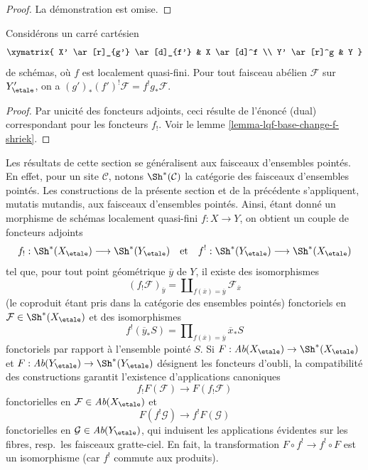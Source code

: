 \begin{proof}
La démonstration est omise.
\end{proof}

\begin{lemma}
\label{lemma-lqf-base-change-upper-shriek}
Considérons un carré cartésien
$$
\xymatrix{
X' \ar[r]_{g'} \ar[d]_{f'} & X \ar[d]^f \\
Y' \ar[r]^g & Y
}
$$
de schémas, où $f$ est localement quasi-fini. Pour tout faisceau abélien $\mathcal{F}$
sur $Y'_\etale$, on a $(g')_*(f')^!\mathcal{F} = f^!g_*\mathcal{F}$.
\end{lemma}

\begin{proof}
Par unicité des foncteurs adjoints, ceci résulte de
l'énoncé (dual) correspondant pour les foncteurs $f_!$.
Voir le lemme \ref{lemma-lqf-base-change-f-shriek}.
\end{proof}

\begin{remark}
\label{remark-pointed-sets}
Les résultats de cette section se généralisent aux faisceaux d'ensembles pointés.
En effet, pour un site $\mathcal{C}$, notons $\Sh^*(\mathcal{C})$ la catégorie des
faisceaux d'ensembles pointés. Les constructions de la présente section et de la précédente
s'appliquent, mutatis mutandis, aux faisceaux d'ensembles pointés. Ainsi, étant donné un morphisme
de schémas localement quasi-fini $f : X \to Y$, on obtient
un couple de foncteurs adjoints
$$
f_! : \Sh^*(X_\etale) \longrightarrow \Sh^*(Y_\etale)
\quad\text{et}\quad
f^! : \Sh^*(Y_\etale) \longrightarrow \Sh^*(X_\etale)
$$
tel que, pour tout point géométrique $\overline{y}$ de $Y$, il existe des
isomorphismes
$$
(f_!\mathcal{F})_{\overline{y}} =
\coprod\nolimits_{f(\overline{x}) = \overline{y}}
\mathcal{F}_{\overline{x}}
$$
(le coproduit étant pris dans la catégorie des ensembles pointés) fonctoriels en
$\mathcal{F} \in \Sh^*(X_\etale)$ et des isomorphismes
$$
f^!(\overline{y}_*S) =
\prod\nolimits_{f(\overline{x}) = \overline{y}}
\overline{x}_*S
$$
fonctoriels par rapport à l'ensemble pointé $S$. Si
$F : \textit{Ab}(X_\etale) \to \Sh^*(X_\etale)$ et
$F : \textit{Ab}(Y_\etale) \to \Sh^*(Y_\etale)$
désignent les foncteurs d'oubli, la compatibilité des constructions
garantit l'existence d'applications canoniques
$$
f_!F(\mathcal{F}) \longrightarrow F(f_!\mathcal{F})
$$
fonctorielles en $\mathcal{F} \in \textit{Ab}(X_\etale)$ et
$$
F(f^!\mathcal{G}) \longrightarrow f^!F(\mathcal{G})
$$
fonctorielles en $\mathcal{G} \in \textit{Ab}(Y_\etale)$,
qui induisent les applications évidentes sur les fibres, resp.\ les faisceaux gratte-ciel.
En fait, la transformation $F \circ f^! \to f^! \circ F$ est un isomorphisme
(car $f^!$ commute aux produits).
\end{remark}







